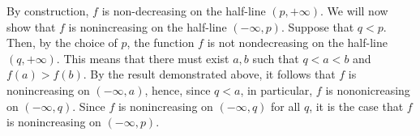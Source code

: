 \documentclass[12pt]{article}
\begin{document}
By construction, $f$ is non-decreasing on the half-line $(p,+\infty)$.  We will now show that $f$ is nonincreasing on the half-line $(-\infty,p)$.  Suppose that $q < p$.  Then, by the choice of $p$, the function $f$ is not nondecreasing on the half-line $(q,+\infty)$.  This means that there must exist $a,b$ such that $q < a < b$ and $f(a) > f(b)$.  By the result demonstrated above, it follows that $f$ is nonincreasing on $(-\infty,a)$, hence, since $q < a$, in particular, $f$ is nononicreasing on $(-\infty,q)$.  Since $f$ is nonincreasing on $(-\infty,q)$ for all $q$, it is the case that $f$ is nonincreasing on $(-\infty,p)$.
\end{document}
